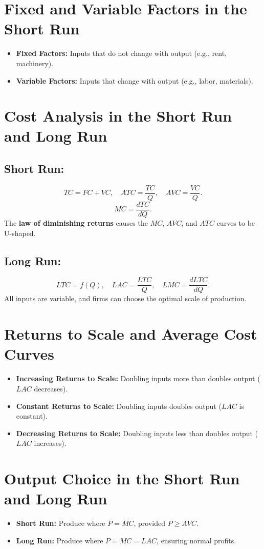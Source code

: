 \section*{Fixed and Variable Factors in the Short Run}
\begin{itemize}
    \item \textbf{Fixed Factors:} Inputs that do not change with output (e.g., rent, machinery).
    \item \textbf{Variable Factors:} Inputs that change with output (e.g., labor, materials).
\end{itemize}

\section*{Cost Analysis in the Short Run and Long Run}
\subsection*{Short Run:}
\[
TC = FC + VC, \quad ATC = \frac{TC}{Q}, \quad AVC = \frac{VC}{Q}.
\]
\[
MC = \frac{dTC}{dQ}.
\]
The \textbf{law of diminishing returns} causes the \(MC\), \(AVC\), and \(ATC\) curves to be U-shaped.

\subsection*{Long Run:}
\[
LTC = f(Q), \quad LAC = \frac{LTC}{Q}, \quad LMC = \frac{dLTC}{dQ}.
\]
All inputs are variable, and firms can choose the optimal scale of production.

\section*{Returns to Scale and Average Cost Curves}
\begin{itemize}
    \item \textbf{Increasing Returns to Scale:} Doubling inputs more than doubles output (\(LAC\) decreases).
    \item \textbf{Constant Returns to Scale:} Doubling inputs doubles output (\(LAC\) is constant).
    \item \textbf{Decreasing Returns to Scale:} Doubling inputs less than doubles output (\(LAC\) increases).
\end{itemize}

\section*{Output Choice in the Short Run and Long Run}
\begin{itemize}
    \item \textbf{Short Run:} Produce where \(P = MC\), provided \(P \geq AVC\).
    \item \textbf{Long Run:} Produce where \(P = MC = LAC\), ensuring normal profits.
\end{itemize}

